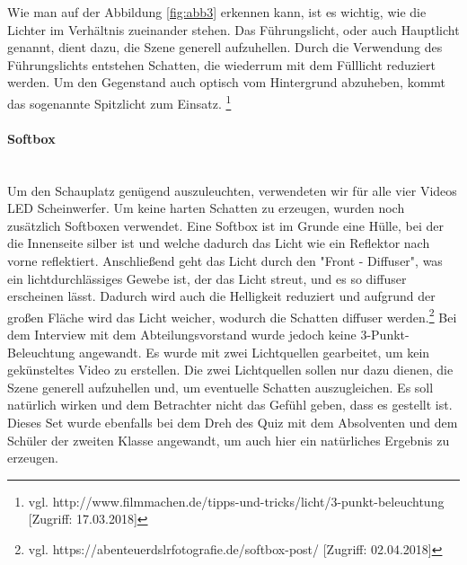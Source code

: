 Wie man auf der Abbildung \ref{fig:abb3} erkennen kann, ist es wichtig, wie die Lichter im Verhältnis zueinander stehen. Das Führungslicht, oder auch Hauptlicht genannt, dient dazu, die Szene generell aufzuhellen. Durch die Verwendung des Führungslichts entstehen Schatten, die wiederrum mit dem Fülllicht reduziert werden. Um den Gegenstand auch optisch vom Hintergrund abzuheben, kommt das sogenannte Spitzlicht zum Einsatz. \footnote{\label{}vgl. http://www.filmmachen.de/tipps-und-tricks/licht/3-punkt-beleuchtung [Zugriff: 17.03.2018]}
\paragraph{Softbox}
\leavevmode \\
Um den Schauplatz genügend auszuleuchten, verwendeten wir für alle vier Videos LED Scheinwerfer. Um keine harten Schatten zu erzeugen, wurden noch zusätzlich Softboxen verwendet.\newline
Eine Softbox ist im Grunde eine Hülle, bei der die Innenseite silber ist und welche dadurch das Licht wie ein Reflektor nach vorne reflektiert. Anschließend geht das Licht durch den "Front - Diffuser", was
ein lichtdurchlässiges Gewebe ist, der das Licht streut, und es so diffuser erscheinen lässt. Dadurch wird auch die Helligkeit reduziert und aufgrund der großen Fläche wird das Licht weicher, wodurch die Schatten diffuser werden.\footnote{vgl. https://abenteuerdslrfotografie.de/softbox-post/ [Zugriff: 02.04.2018]}\newline
Bei dem Interview mit dem Abteilungsvorstand wurde jedoch keine 3-Punkt-Beleuchtung angewandt. Es wurde mit zwei Lichtquellen gearbeitet, um kein gekünsteltes Video zu erstellen. Die zwei Lichtquellen sollen nur dazu dienen, die Szene generell aufzuhellen und, um eventuelle Schatten auszugleichen. Es soll natürlich wirken und dem Betrachter nicht das Gefühl geben, dass es gestellt ist.  Dieses Set wurde ebenfalls bei dem Dreh des Quiz mit dem Absolventen und dem Schüler der zweiten Klasse angewandt, um auch hier ein natürliches Ergebnis zu erzeugen.